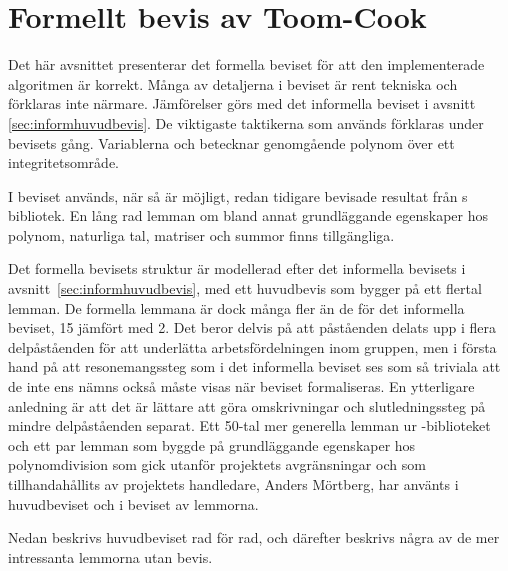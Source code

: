 \section{Formellt bevis av Toom-Cook}
\label{sec:formellbevis}
Det här avsnittet presenterar det formella beviset för att den implementerade
algoritmen är korrekt. Många av detaljerna i beviset är rent tekniska och
förklaras inte närmare. Jämförelser görs med det informella beviset i avsnitt
\ref{sec:informhuvudbevis}. De viktigaste taktikerna som används förklaras under
bevisets gång. Variablerna  och  betecknar genomgående polynom över
ett integritetsområde.

I beviset används, när så är möjligt, redan tidigare bevisade resultat från
\ssr{}s bibliotek. En lång rad lemman om bland annat grundläggande egenskaper
hos polynom, naturliga tal, matriser och summor finns tillgängliga.

Det formella bevisets struktur är modellerad efter det informella bevisets i
avsnitt~\ref{sec:informhuvudbevis}, med ett huvudbevis som bygger på ett
flertal lemman. De formella lemmana är dock många fler än de för det
informella beviset, 15 jämfört med 2. Det beror delvis på att påståenden delats
upp i flera delpåståenden för att underlätta arbetsfördelningen inom gruppen,
men i första hand på att resonemangssteg som i det informella beviset ses som
så triviala att de inte ens nämns också måste visas när beviset formaliseras.
En ytterligare anledning är att det är lättare att göra omskrivningar och
slutledningssteg på mindre delpåståenden separat. Ett 50-tal mer generella
lemman ur \ssr{}-biblioteket och ett par lemman som byggde på grundläggande
egenskaper hos polynomdivision som gick utanför projektets avgränsningar och
som tillhandahållits av projektets handledare, Anders Mörtberg, har använts i
huvudbeviset och i beviset av lemmorna.

Nedan beskrivs huvudbeviset rad för rad, och därefter beskrivs några av de mer
intressanta lemmorna utan bevis.

